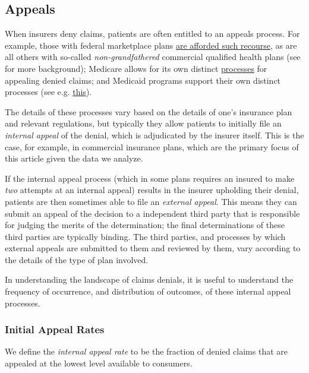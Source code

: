 \documentclass[12pt, a4paper,twoside,parskip=full]{report}
\theoremstyle{plain} %
\theoremstyle{definition} %
\theoremstyle{remark} %
\numberwithin{equation}{chapter}
\begin{document}
		
		\subsection{Appeals}
		
		When insurers deny claims, patients are often entitled to an appeals
		process. For example, those with federal marketplace plans \href{https://www.healthcare.gov/appeal-insurance-company-decision/appeals/}{are afforded such recourse},
		as are all others with so-called \emph{non-grandfathered} commercial qualified health plans
		(see \cite{pollitz2021} for more background); Medicare allows for
		its own distinct \href{https://www.medicare.gov/claims-appeals/how-do-i-file-an-appeal}{processes} for appealing denied claims; and Medicaid programs support their own distinct processes (see e.g. \href{https://www.kff.org/wp-content/uploads/2013/01/8287.pdf}{this}).
		
		The details of these processes vary based on the details of one's insurance plan and relevant regulations,
		but typically they allow patients to initially file an \emph{internal appeal} of the denial,
		which is adjudicated by the insurer itself. This is the case, for example, in commercial insurance plans,
		which are the primary focus of this article given the data we analyze.
		
		If the internal appeal process (which in some plans requires an insured to make \emph{two} attempts at an internal appeal)
		results in the insurer upholding their denial, patients
		are then sometimes able to file an \emph{external appeal}. This means they can submit an
		appeal of the decision to a independent third party that is
		responsible for judging the merits of the determination; the final determinations of these third parties are typically binding.
		The third parties, and processes by which external appeals are submitted to them and reviewed by them,
		vary according to the details of the type of plan involved.
		
		In understanding the landscape of claims denials, it is useful to understand
		the frequency of occurrence, and distribution of outcomes, of these internal appeal processes.
		
		
		\subsubsection{Initial Appeal Rates}
		
		We define the \emph{internal appeal rate} to be the fraction of denied claims that are appealed at the lowest level available to consumers.
		
\end{document}
